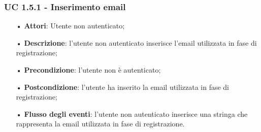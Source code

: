 
\subsubsection{UC 1.5.1 - Inserimento email}
\begin{itemize}
	\item[•]\textbf{Attori}: Utente non autenticato;
	\item[•]\textbf{Descrizione}: l’utente non autenticato inserisce l'email utilizzata in fase di registrazione;
	\item[•]\textbf{Precondizione}: l’utente non è autenticato;
	\item[•]\textbf{Postcondizione}: l’utente ha inserito la email utilizzata in fase di registrazione;
	\item[•]\textbf{Flusso degli eventi}: l'utente non autenticato inserisce una stringa che rappresenta la email utilizzata in fase di registrazione. 
\end{itemize}


